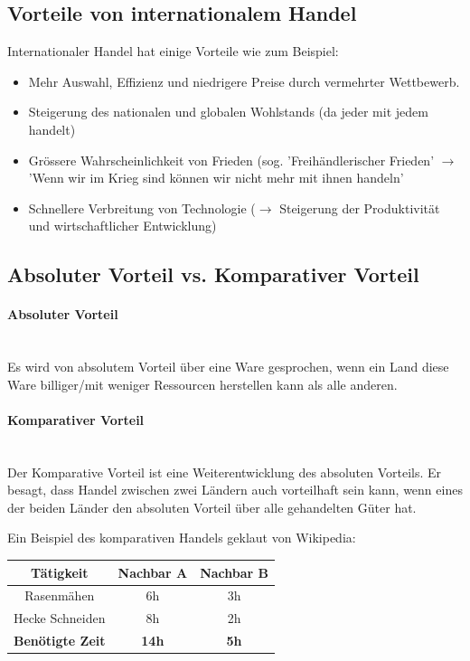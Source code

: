 \documentclass[a4paper, 11pt]{article}
\begin{document}
\subsection{Vorteile von internationalem Handel}

Internationaler Handel hat einige Vorteile wie zum Beispiel:

\begin{itemize}
	\item Mehr Auswahl, Effizienz und niedrigere Preise durch vermehrter Wettbewerb.
	\item Steigerung des nationalen und globalen Wohlstands (da jeder mit jedem handelt)
	\item Grössere Wahrscheinlichkeit von Frieden (sog. 'Freihändlerischer Frieden' $\rightarrow$ 'Wenn wir im Krieg sind können wir nicht mehr mit ihnen handeln'
	\item Schnellere Verbreitung von Technologie ($\rightarrow$ Steigerung der Produktivität und wirtschaftlicher Entwicklung)
\end{itemize}

\subsection{Absoluter Vorteil vs. Komparativer Vorteil}

\begin{multicols}{2}
	\paragraph{Absoluter Vorteil} \mbox{} \\
	Es wird von absolutem Vorteil über eine Ware gesprochen, wenn ein Land diese Ware billiger/mit weniger Ressourcen herstellen kann als alle anderen.
\columnbreak
	\paragraph{Komparativer Vorteil} \mbox{}\\
	Der Komparative Vorteil ist eine Weiterentwicklung des absoluten Vorteils. Er besagt, dass Handel zwischen zwei Ländern auch vorteilhaft sein kann, wenn eines der beiden Länder den absoluten Vorteil über alle gehandelten Güter hat.
\end{multicols}

Ein Beispiel des komparativen Handels geklaut von Wikipedia:

\vspace{10px}
\begin{table}
	\begin{tabular}{|c|c|c|}
		\hline
		\textbf{Tätigkeit} & \textbf{Nachbar A} & \textbf{Nachbar B} \\
		\hline
		Rasenmähen & 6h & 3h \\
		\hline
		Hecke Schneiden & 8h & 2h \\
		\hline
		\textbf{Benötigte Zeit} & \textbf{14h} & \textbf{5h} \\
		\hline
	\end{tabular}
\end{table}
\end{document}
